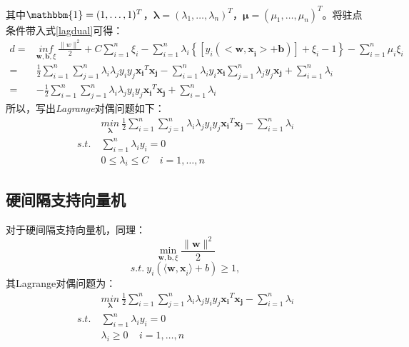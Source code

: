 \documentclass[twoside]{article}
\begin{document}
其中$\mathbbm{1}=(1,\ldots,1)^T$，$\boldsymbol{\lambda}=(\lambda_1,\ldots,\lambda_n)^T$，$\boldsymbol{\mu}=(\mu_1,\ldots,\mu_n)^T$。将驻点条件带入式\ref{lagdual}可得：
\begin{equation}
    \begin{aligned}
        d=&\underset{\boldsymbol{w},\boldsymbol{b},\xi}{inf}\ \frac{\lVert w \rVert ^2}{2}+C\sum_{i=1}^n{\xi _i-\sum_{i=1}^n{\lambda _i\left\{ \left[ y_i\left( <\boldsymbol{w,x}_{\boldsymbol{i}}>+\boldsymbol{b} \right) \right] +\xi _i-1 \right\} -\sum_{i=1}^n{\mu _i\xi _i}}}\\
        =&\frac{1}{2}\sum_{i=1}^n \sum_{j=1}^n \lambda_i \lambda_j y_i y_j \boldsymbol{x_i}^T \boldsymbol{x_j} -\sum_{i=1}^n
 \lambda_i y_i \boldsymbol{x_i} \sum_{j=1}^n \lambda_j y_j \boldsymbol{x_j} + \sum_{i=1}^n \lambda_i\\
 =& -\frac{1}{2}\sum_{i=1}^n \sum_{j=1}^n \lambda_i \lambda_j y_i y_j \boldsymbol{x_i}^T \boldsymbol{x_j}+ \sum_{i=1}^n \lambda_i
 \end{aligned}
\end{equation}
所以，写出\textit{Lagrange}对偶问题如下：
\begin{equation}
    \begin{aligned}
        &\underset{\boldsymbol{\lambda}}{min}\  \frac{1}{2}\sum_{i=1}^n \sum_{j=1}^n \lambda_i \lambda_j y_i y_j \boldsymbol{x_i}^T \boldsymbol{x_j}- \sum_{i=1}^n \lambda_i\\
        s.t.~&\sum_{i=1}^n\lambda_i y_i =0\\
        &0 \leq \lambda_i \leq C ~~~~~i=1,\ldots,n
    \end{aligned}
\end{equation}
\subsection*{硬间隔支持向量机}
对于硬间隔支持向量机，同理：
$$
\underset{\boldsymbol{w,b,}\xi}{\min}\frac{\lVert \boldsymbol{w} \rVert ^2}{2}
$$
$$
s.t.\ y_i\left( \langle \left. \boldsymbol{w,x}_i \rangle +b \right. \right) \geq 1 ,
$$
其Lagrange对偶问题为：
\begin{equation}
    \begin{aligned}
        &\underset{\boldsymbol{\lambda}}{min}\  \frac{1}{2}\sum_{i=1}^n \sum_{j=1}^n \lambda_i \lambda_j y_i y_j \boldsymbol{x_i}^T \boldsymbol{x_j}- \sum_{i=1}^n \lambda_i\\
        s.t.~&\sum_{i=1}^n\lambda_i y_i =0\\
        & \lambda_i \ge 0  ~~~~~i=1,\ldots,n
    \end{aligned}
\end{equation}
\end{document}

